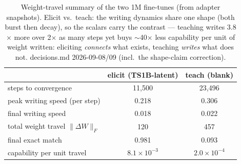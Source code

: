 \begin{table}[t]
\centering
\begin{tabular}{lcc}
\hline
 & elicit (TS1B-latent) & teach (blank) \\
\hline
steps to convergence & 11{,}500 & 23{,}496 \\
peak writing speed (per step) & 0.218 & 0.306 \\
final writing speed & 0.018 & 0.022 \\
total weight travel $\|\Delta W\|_F$ & 120 & 457 \\
final exact match & 0.981 & 0.093 \\
capability per unit travel & $8.1\times10^{-3}$ & $2.0\times10^{-4}$ \\
\hline
\end{tabular}
\caption{Weight-travel summary of the two 1M fine-tunes (from adapter snapshots). Elicit vs.\ teach: the writing dynamics share one shape (both burst then decay), so the scalars carry the contrast --- teaching writes 3.8$\times$ more over 2$\times$ as many steps yet buys $\sim$40$\times$ less capability per unit of weight written: eliciting \emph{connects} what exists, teaching \emph{writes} what does not. decisions.md 2026-09-08/09 (incl.\ the shape-claim correction).}
\label{tab:weight_travel}
\end{table}
